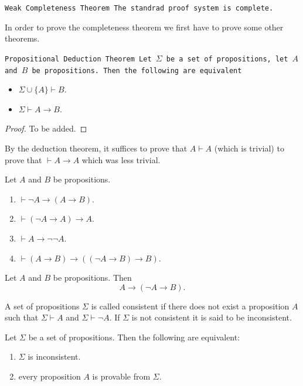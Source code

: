 \documentclass[11pt,a4paper]{article}
\renewcommand{\implies}{\rightarrow}
\begin{document}
\begin{theorem}\label{thm:weak-completeness}\tt{Weak Completeness Theorem}
  The standrad proof system is complete.
\end{theorem}

In order to prove the completeness theorem we first have to prove
some other theorems.

\begin{theorem}\tt{Propositional Deduction Theorem}
  Let $\Sigma$ be a set of propositions, let $A$ and $B$ be propositions.
  Then the following are equivalent
  \begin{itemize}
    \item[(1)] $\Sigma \cup \{A\} \vdash B$.
    \item[(2)] $\Sigma \vdash A \implies B$.
  \end{itemize}
\end{theorem}
\begin{proof}
  To be added.
\end{proof}

\begin{remark}
  By the deduction theorem, it suffices to prove that $A \vdash A$
  (which is trivial) to prove that $\vdash A \to A$ which was less
  trivial.
\end{remark}

\begin{proposition}
  Let $A$ and $B$ be propositions.
  \begin{enumerate}
    \item[(1)] $\vdash \neg A \implies (A \implies B)$.
    \item[(2)] $\vdash (\neg A \implies A) \implies A$.
    \item[(3)] $\vdash A \implies \neg \neg A$.
    \item[(4)] $\vdash (A \implies B) \implies 
      ((\neg A \implies B) \implies B)$.
  \end{enumerate}
\end{proposition}

\begin{proposition}
  Let $A$ and $B$ be propositions. Then
  \[ A \implies (\neg A \implies B). \]
\end{proposition}

\begin{definition}[Consistency]
  A set of propositions $\Sigma$ is called consistent if there does
  not exist a proposition $A$ such that $\Sigma \vdash A$ and 
  $\Sigma \vdash \neg A$. If $\Sigma$ is not consistent it is said
  to be inconsistent.
\end{definition}
\begin{proposition}
  Let $\Sigma$ be a set of propositions. Then the following are equivalent:
  \begin{enumerate}
    \item[(1)] $\Sigma$ is inconsistent.
    \item[(2)] every proposition $A$ is provable from $\Sigma$.
  \end{enumerate}
\end{proposition}
\end{document}
